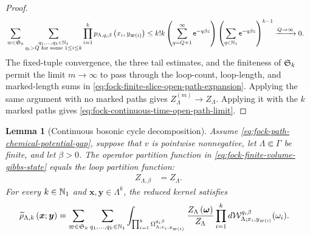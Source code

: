 \documentclass[11pt,a4paper]{article}
\theoremstyle{plain}
\newtheorem{lem}[thm]{Lemma}
\theoremstyle{definition}
\theoremstyle{remark}
\begin{document}
\begin{proof}
$$\begin{aligned}
&
\sum_{\varpi\in\grsym{k}}
\sum_{\substack{q_1,\ldots,q_k\in\semigrposint\\q_i>Q\text{ for some }1\leq i\leq k}}
\prod_{i=1}^{k}
\fun{p_{\Lambda,q_i\beta}}{x_i,y_{\fun{\varpi}{i}}}
\leq
k!k
\rbk{
\sum_{q=Q+1}^{\infty}\napiernum^{-q\beta\varepsilon}}
\rbk{
\sum_{q\in\semigrposint}\napiernum^{-q\beta\varepsilon}}^{k-1}
\xrightarrow{Q \to \infty}
0.
\end{aligned}$$
The fixed-tuple convergence, the three tail estimates, and the finiteness of $\grsym{k}$ permit the limit
$m\to\infty$ to pass through the loop-count, loop-length, and marked-length sums in
\eqref{eq:fock-finite-slice-open-path-expansion}.
Applying the same argument with no marked paths gives $Z_{\Lambda}^{(m)}\to Z_{\Lambda}$.
Applying it with the $k$ marked paths gives \eqref{eq:fock-continuous-time-open-path-limit}.
\end{proof}

\begin{lem}[Continuous bosonic cycle decomposition]\label{lem:fock-continuous-bosonic-cycle-decomposition}
Assume \eqref{eq:fock-path-chemical-potential-gap}, suppose that $v$ is pointwise nonnegative, let
$\Lambda\Subset\Gamma$ be finite, and let $\beta>0$.
The operator partition function in \eqref{eq:fock-finite-volume-gibbs-state} equals the loop partition function:
\begin{equation}
\begin{aligned}
Z_{\Lambda,\beta}
& =
Z_{\Lambda}.
\end{aligned}
\label{eq:fock-continuous-cycle-partition-identity}
\end{equation}
For every $k\in\mathbb{N}_1$ and $\boldsymbol{x},\boldsymbol{y}\in\Lambda^k$, the reduced kernel satisfies
\begin{equation}
\begin{aligned}
\fun{\widetilde{\rho}_{\Lambda,k}}{\boldsymbol{x};\boldsymbol{y}}
& =
\sum_{\varpi \in \grsym{k}}
\sum_{q_1,\ldots,q_k \in \semigrposint}
\int_{\prod_{i = 1}^{k}\Omega_{\Lambda;x_i,y_{\fun{\varpi}{i}}}^{q_i\beta}}
\frac{\fun{Z_{\Lambda}}{\boldsymbol{\omega}}}{Z_{\Lambda}}
\prod_{i = 1}^{k}
\opdmsr{\msrcal{W}_{\Lambda;x_i,y_{\fun{\varpi}{i}}}^{q_i\beta}}(\omega_i).
\end{aligned}
\label{eq:fock-continuous-cycle-reduced-kernel}
\end{equation}
\end{lem}
\end{document}
